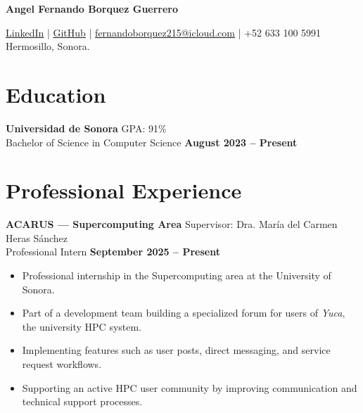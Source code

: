 \documentclass[11pt]{article}
\begin{document}
{\Huge \textbf{Angel Fernando Borquez Guerrero}} \\
\vspace{-0.4cm}
\par \href{https://www.linkedin.com/in/fernandoborquez/}{LinkedIn} \quad | \quad
\href{https://github.com/FernyBoy}{GitHub} \quad | \quad
\href{mailto:fernandoborquez215@icloud.com}{fernandoborquez215@icloud.com} \quad | \quad
+52 633 100 5991 \\
Hermosillo, Sonora.





\section*{Education}
\textbf{Universidad de Sonora} \hfill GPA: 91\%\\
Bachelor of Science in Computer Science \hfill \textbf{August 2023 -- Present}





\section*{Professional Experience}
\textbf{ACARUS — Supercomputing Area} \hfill Supervisor: Dra. María del Carmen Heras Sánchez\\
Professional Intern \hfill \textbf{September 2025 -- Present}
\vspace{-0.3cm}
\begin{itemize}[leftmargin=*]
    \item Professional internship in the Supercomputing area at the University of Sonora.
    \vspace{-0.3cm}
    \item Part of a development team building a specialized forum for users of \textit{Yuca}, the university HPC system.
    \vspace{-0.3cm}
    \item Implementing features such as user posts, direct messaging, and service request workflows.
    \vspace{-0.3cm}
    \item Supporting an active HPC user community by improving communication and technical support processes.
\end{itemize}
\end{document}
